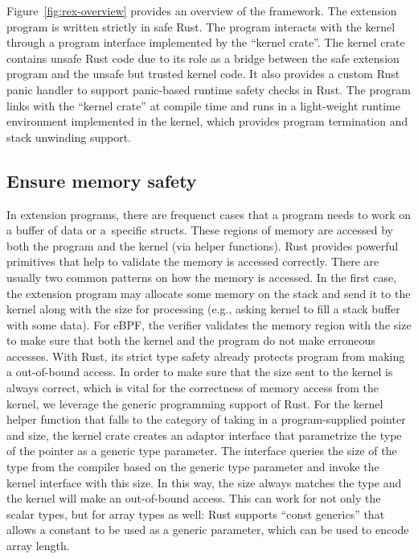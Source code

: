 Figure~\ref{fig:rex-overview} provides an overview of the \projname{} framework.
The extension program is written strictly in safe Rust.
The program interacts with the kernel through a program interface implemented
    by the \projname{} ``kernel crate''.
The kernel crate contains unsafe Rust code due to its role as a bridge between
    the safe extension program and the unsafe but trusted kernel code.
It also provides a custom Rust panic handler to support panic-based runtime
    safety checks in Rust.
The program links with the ``kernel crate'' at compile time and runs in a
    light-weight runtime environment implemented in the kernel, which provides
    program termination and stack unwinding support.

\subsection{Ensure memory safety}
In extension programs, there are
    frequenct cases that a program needs to work on a buffer of data or a\
    specific structs.
These regions of memory are accessed by both the program and the kernel (via
    helper functions).
Rust provides powerful primitives that help to validate the memory is
    accessed correctly.
There are usually two common patterns on how the memory is accessed.
In the first case, the extension program may allocate some memory on the stack
    and send it to the kernel along with the size for processing (e.g.,
    asking kernel to fill a stack buffer with some data).
For eBPF, the verifier validates the memory region with the size to make sure
    that both the kernel and the program do not make erroneous accesses.
With Rust, its strict type safety already protects program from making a
    out-of-bound access.
In order to make sure that the size sent to the kernel is always correct, which
    is vital for the correctness of memory access from the kernel, we leverage
    the generic programming support of Rust.
For the kernel helper function that falls to the category of taking in a
    program-supplied pointer and size, the \projname{} kernel crate creates an
    adaptor interface that parametrize the type of the pointer as a generic
    type parameter.
The interface queries the size of the type from the compiler based on
    the generic type parameter and invoke the kernel interface with this size.
In this way, the size always matches the type and the kernel will make an
    out-of-bound access.
This can work for not only the scalar types, but for array types as well: Rust
    supports ``const generics'' that allows a constant to be used as a generic
    parameter, which can be used to encode array length.

